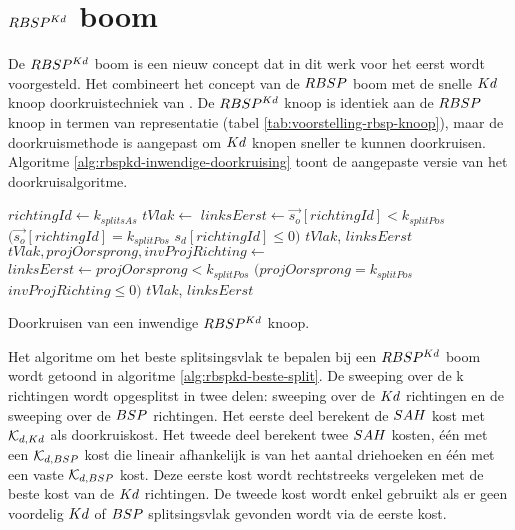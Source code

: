 \section{$RBSP^{Kd}$ boom}
\label{sec:h4-rbspkd}
De $RBSP^{Kd}$ boom is een nieuw concept dat in dit werk voor het eerst wordt voorgesteld.
Het combineert het concept van de $RBSP$ boom met de snelle $Kd$ knoop doorkruistechniek van \authorIze{} \cite{ize}.
De $RBSP^{Kd}$ knoop is identiek aan de $RBSP$ knoop in termen van representatie (tabel \ref{tab:voorstelling-rbsp-knoop}), maar de doorkruismethode is aangepast om $Kd$ knopen sneller te kunnen doorkruisen.
Algoritme \ref{alg:rbspkd-inwendige-doorkruising} toont de aangepaste versie van het doorkruisalgoritme.\\

\begin{dutchalgorithm}
    \begin{algorithmic}       
            \State $richtingId \gets k_{splitsAs}$
                \State $tVlak \gets $ 
                \State $linksEerst \gets \vec{s_o}[richtingId] < k_{splitPos}$ \Or $(\vec{s_o}[richtingId] = k_{splitPos}$ \And $s_d[richtingId] \leq 0)$
                \State \Return $tVlak$, $linksEerst$
            \Else
                \State $tVlak, projOorsprong, invProjRichting \gets $ 
                 \State $linksEerst \gets projOorsprong < k_{splitPos}$ \Or $(projOorsprong = k_{splitPos}$ \And $invProjRichting \leq 0)$
                \State \Return $tVlak$, $linksEerst$
            \EndIf
        \EndFunction
    \end{algorithmic}
    \caption{Doorkruisen van een inwendige $RBSP^{Kd}$ knoop.}
    \label{alg:rbspkd-inwendige-doorkruising}
\end{dutchalgorithm}

Het algoritme om het beste splitsingsvlak te bepalen bij een $RBSP^{Kd}$ boom wordt getoond in algoritme \ref{alg:rbspkd-beste-split}.
De sweeping over de k richtingen wordt opgesplitst in twee delen: sweeping over de $Kd$ richtingen en de sweeping over de $BSP$ richtingen.
Het eerste deel berekent de $SAH$ kost met $\mathcal{K}_{d,Kd}$ als doorkruiskost.
Het tweede deel berekent twee $SAH$ kosten, één met een $\mathcal{K}_{d,BSP}$ kost die lineair afhankelijk is van het aantal driehoeken en één met een vaste $\mathcal{K}_{d,BSP}$ kost.
Deze eerste kost wordt rechtstreeks vergeleken met de beste kost van de $Kd$ richtingen.
De tweede kost wordt enkel gebruikt als er geen voordelig $Kd$ of $BSP$ splitsingsvlak gevonden wordt via de eerste kost.

